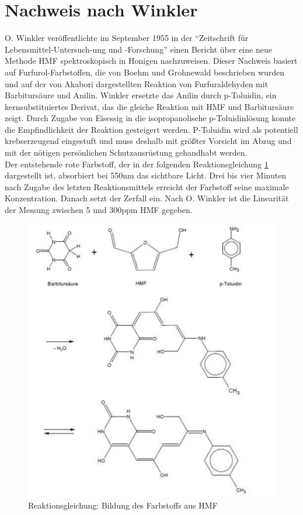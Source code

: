 \section{Nachweis nach Winkler}

O. Winkler veröffentlichte im September 1955 in der ``Zeitschrift für Lebensmittel-Untersuch-ung und -Forschung'' einen Bericht über eine neue Methode HMF spektroskopisch in Honigen nachzuweisen. Dieser Nachweis basiert auf Furfurol-Farbstoffen, die von Boehm und Grohnewald beschrieben wurden und auf der von Akabori dargestellten Reaktion von Furfuraldehyden mit Barbitursäure und Anilin. Winkler ersetzte das Anilin durch p-Toluidin, ein kernsubstituiertes Derivat, das die gleiche Reaktion mit HMF und Barbitursäure zeigt. Durch Zugabe von Eisessig in die isopropanolische p-Toluidinlösung konnte die Empfindlichkeit der Reaktion gesteigert werden. P-Toluidin wird als potentiell krebserzeugend eingestuft und muss deshalb mit größter Vorsicht im Abzug und mit der nötigen persönlichen Schutzausrüstung gehandhabt werden.\\
Der entstehende rote Farbstoff, der in der folgenden Reaktionsgleichung \ref{fig:Farbreaktionsgleichung2} dargestellt ist, absorbiert bei 550nm das sichtbare Licht. Drei bis vier Minuten nach Zugabe des letzten Reaktionsmittels erreicht der Farbstoff seine maximale Konzentration. Danach setzt der Zerfall ein. Nach O. Winkler ist die Linearität der Messung zwischen 5 und 300ppm HMF gegeben.~\cite{Winkler}

\begin{figure}[htbp]
    \centering
        \includegraphics[width=1.00\textwidth]{../Bilder/Farbreaktionsgleichung2.pdf}
    \caption{Reaktionsgleichung: Bildung des Farbstoffs aus HMF}
    \label{fig:Farbreaktionsgleichung2}
\end{figure}

